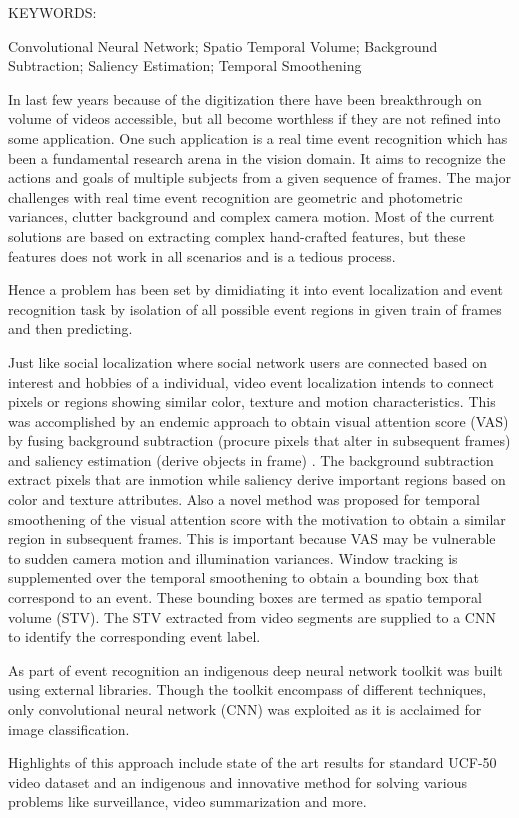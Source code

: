 \abstract

\noindent KEYWORDS: \hspace*{0.5em} \parbox[t]{4.4in}{Convolutional Neural Network; Spatio Temporal Volume; Background Subtraction; Saliency Estimation; Temporal Smoothening}

\vspace*{24pt}
In last few years because of the digitization there have been breakthrough on volume of videos accessible, but all become worthless if they are not refined into some application. One such application is a real time event recognition which has been a fundamental research arena in the vision domain. It aims to recognize the actions and goals of multiple subjects from a given sequence of frames. The major challenges with real time event recognition are geometric and photometric variances, clutter background and complex camera motion. Most of the current solutions are based on extracting complex hand-crafted features, but these features does not work in all scenarios and is a tedious process. 

\par Hence a problem has been set by dimidiating it into event localization and event recognition task by isolation of all possible event regions in given train of frames and then predicting. 

\par Just like social localization where social network users are connected based on interest and hobbies of a individual, video event localization intends to connect pixels or regions showing similar color, texture and motion characteristics.  This was accomplished by an endemic approach to obtain visual attention score (VAS) by fusing background subtraction (procure pixels that alter in subsequent frames) and saliency estimation (derive objects in frame) . The background subtraction extract pixels that are inmotion while saliency  derive important regions based on color and texture attributes. Also a  novel method was proposed for temporal smoothening of the visual attention score  with the motivation to obtain a similar region in subsequent frames. This is important because VAS may be vulnerable to sudden camera motion and illumination variances.  Window tracking is supplemented over the temporal smoothening to obtain a bounding box that correspond to an event. These bounding boxes are termed as spatio temporal volume (STV). The STV extracted from video segments are supplied to a CNN to identify the corresponding event label.

\par As part of event recognition an indigenous deep neural network toolkit was built using external libraries. Though the toolkit encompass of different techniques, only convolutional neural network (CNN) was exploited as it is acclaimed for image classification. 

\par Highlights of this approach include state of the art results for standard UCF-50 video dataset and an indigenous and innovative method for solving various problems like surveillance, video summarization and more.  
\pagebreak